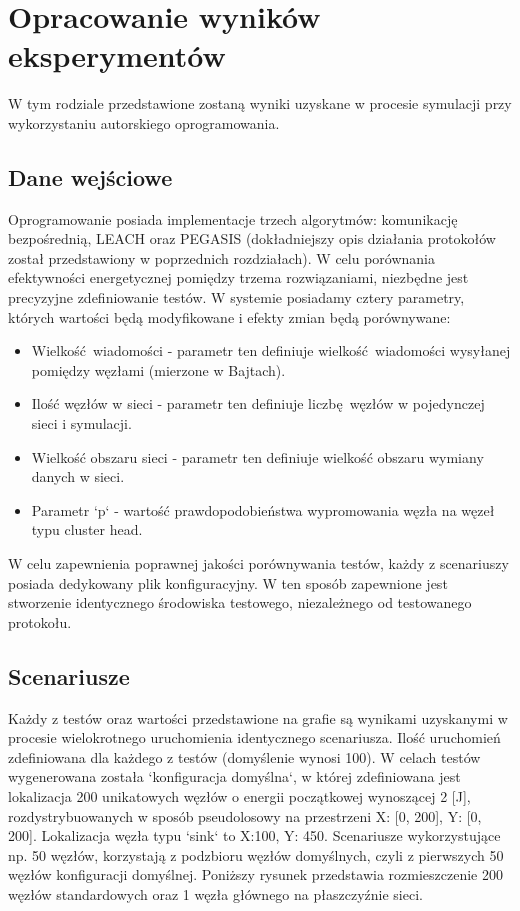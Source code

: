 \documentclass[a4paper,12pt,twoside,openany]{report}
\begin{document}
\chapter{Opracowanie wyników eksperymentów}

W tym rodziale przedstawione zostaną wyniki uzyskane w procesie symulacji przy wykorzystaniu autorskiego oprogramowania.

\section{Dane wejściowe}

Oprogramowanie posiada implementacje trzech algorytmów: komunikację bezpośrednią, LEACH oraz PEGASIS (dokładniejszy opis działania protokołów został przedstawiony w poprzednich rozdziałach).
W celu porównania efektywności energetycznej pomiędzy trzema rozwiązaniami, niezbędne jest precyzyjne zdefiniowanie testów.
W systemie posiadamy cztery parametry, których wartości będą modyfikowane i efekty zmian będą porównywane:

\begin{itemize}
 \item Wielkość wiadomości - parametr ten definiuje wielkość wiadomości wysyłanej pomiędzy węzłami (mierzone w Bajtach).
 \item Ilość węzłów w sieci - parametr ten definiuje liczbę węzłów w pojedynczej sieci i symulacji.
 \item Wielkość obszaru sieci - parametr ten definiuje wielkość obszaru wymiany danych w sieci.
 \item Parametr `p` - wartość prawdopodobieństwa wypromowania węzła na węzeł typu cluster head.
\end{itemize}

W celu zapewnienia poprawnej jakości porównywania testów, każdy z scenariuszy posiada dedykowany plik konfiguracyjny.
W ten sposób zapewnione jest stworzenie identycznego środowiska testowego, niezależnego od testowanego protokołu.

\section{Scenariusze}

Każdy z testów oraz wartości przedstawione na grafie są wynikami uzyskanymi w procesie wielokrotnego uruchomienia identycznego scenariusza. 
Ilość uruchomień zdefiniowana dla każdego z testów (domyślenie wynosi 100).
W celach testów wygenerowana została `konfiguracja domyślna`, w której zdefiniowana jest lokalizacja 200 unikatowych węzłów o energii początkowej wynoszącej 2 [J], 
rozdystrybuowanych w sposób pseudolosowy na przestrzeni X: [0, 200], Y: [0, 200]. Lokalizacja węzła typu `sink` to X:100, Y: 450.
Scenariusze wykorzystujące np. 50 węzłów, korzystają z podzbioru węzłów domyślnych, czyli z pierwszych 50 węzłów konfiguracji domyślnej.
Poniższy rysunek przedstawia rozmieszczenie 200 węzłów standardowych oraz 1 węzła głównego na płaszczyźnie sieci.
\end{document}
